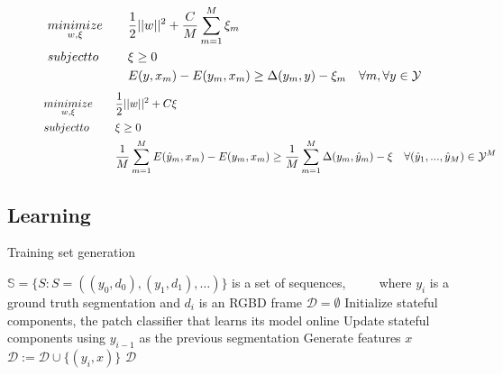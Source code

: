 \documentclass[journal]{IEEEtran}
\begin{document}
\begin{figure*}
  \normalsize
  \hrulefill
  
  \begin{equation}
    \begin{aligned}
      & \minimize{w, \xi} & & \frac{1}{2} ||w||^2 + \frac{C}{M} \sum_{m=1}^M \xi_m \label{eqn:nslack} \\
      & \st & & \xi \geq 0 \\
      & & & E ( y, x_m ) - E ( y_m, x_m ) \geq \Delta (y_m, y) - \xi_m \quad \forall m, \forall y \in \mathcal{Y} \\
    \end{aligned}
  \end{equation}
  \vspace{0.2in}
  \begin{equation}
    \begin{aligned}
      & \minimize{w, \xi} & & \frac{1}{2} ||w||^2 + C\xi \label{eqn:oneslack} \\
      & \st & & \xi \geq 0 \\
      & & & \frac{1}{M} \sum_{m=1}^M E ( \hat{y}_m, x_m )
      - E ( y_m, x_m ) \geq \frac{1}{M} \sum_{m=1}^M \Delta(y_m, \hat{y}_m) - \xi \quad \forall (\hat{y}_1, ..., \hat{y}_M) \in \mathcal{Y}^M
    \end{aligned}
  \end{equation}

  \hrulefill
  \vspace*{4pt}
\end{figure*}


\subsection{Learning}
\label{sec:learning}

\begin{algorithm}
  \caption{Training set generation}
  \label{alg:dataset}
  \begin{algorithmic}
    \STATE $\mathbb{S} = \{S : S = ((y_0, d_0), (y_1, d_1),                       \dots)\}$ is a set of sequences,
\STATE $\qquad$ where $y_i$ is a ground truth segmentation and $d_i$ is an RGBD frame
\STATE $\mathcal{D} = \emptyset$
\STATE Initialize stateful components, \eg the patch classifier that learns its model online
\STATE Update stateful components using $y_{i-1}$ as the previous segmentation
\STATE Generate features $x$
\STATE $\mathcal{D} := \mathcal{D} \cup \{(y_i, x)\}$
\ENDFOR
\ENDFOR
\RETURN $\mathcal{D}$
  \end{algorithmic}
\end{algorithm}
\end{document}
